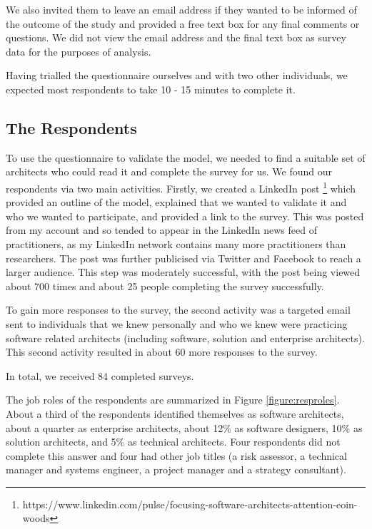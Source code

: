 We also invited them to leave an email address if they wanted to be informed of the outcome of the study and provided a free text box for any final comments or questions.  We did not view the email address and the final text box as survey data for the purposes of analysis.

Having trialled the questionnaire ourselves and with two other individuals, we expected most respondents to take 10 - 15 minutes to complete it.

\subsection{The Respondents}

To use the questionnaire to validate the model, we needed to find a suitable set of architects who could read it and complete the survey for us.  We found our respondents via two main activities.  
Firstly, we created a LinkedIn post \footnote{https://www.linkedin.com/pulse/focusing-software-architects-attention-eoin-woods} which provided an outline of the model, explained that we wanted to validate it and who we wanted to participate, and provided a link to the survey.  This was posted from my account and so tended to appear in the LinkedIn news feed of practitioners, as my LinkedIn network contains many more practitioners than researchers.  The post was further publicised via Twitter and Facebook to reach a larger audience.  This step was moderately successful, with the post being viewed about 700 times and about 25 people completing the survey successfully.

To gain more responses to the survey, the second activity was a targeted email sent to individuals that we knew personally and who we knew were practicing software related architects (including software, solution and enterprise architects).  This second activity resulted in about 60 more responses to the survey.

In total, we received 84 completed surveys.

The job roles of the respondents are summarized in Figure \ref{figure:resproles}.  About a third of the respondents identified themselves as software architects, about a quarter as enterprise architects, about 12\% as software designers, 10\% as solution architects, and 5\% as technical architects.  Four respondents did not complete this answer and four had other job titles (a risk assessor, a technical manager and systems engineer, a project manager and a strategy consultant).

